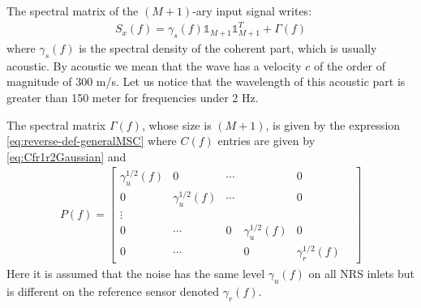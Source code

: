 
The spectral matrix of the $(M+1)$-ary input signal writes:
\begin{eqnarray}
\label{eq:Sxf}
 S_x(f) = \gamma_{s}(f) \mathds{1}_{M+1}\mathds{1}_{M+1}^T+ \Gamma(f)
\end{eqnarray}
where $\gamma_{s}(f)$ is the spectral density of the coherent part, which is usually acoustic. By acoustic we mean that the wave has a velocity $c$ of the order of magnitude of $300$ m/s. Let us notice that the wavelength of this acoustic part is greater  than 150 meter for frequencies under 2 Hz.

The spectral matrix $\Gamma(f)$, whose size is $(M+1)$, is given by the expression \eqref{eq:reverse-def-generalMSC}  where $C(f)$ entries are given by \eqref{eq:Cfr1r2Gaussian} and 
\begin{eqnarray}
  \label{eq:spectral-content}
 P(f) =   \begin{bmatrix}
  \gamma_{u}^{1/2}(f)&0&\cdots&&0&
  \\
  0&\gamma_{u}^{1/2}(f)&\cdots&&0&
  \\
  \vdots
  \\
  0&\cdots&0&\gamma_{u}^{1/2}(f)&0
  \\
  0&\cdots&&0&\gamma_{r}^{1/2}(f)
  \end{bmatrix}
\end{eqnarray}
Here it is assumed that the noise has the same level $\gamma_{u}(f)$ on all NRS inlets but is different on the reference sensor denoted $\gamma_{r}(f)$.


